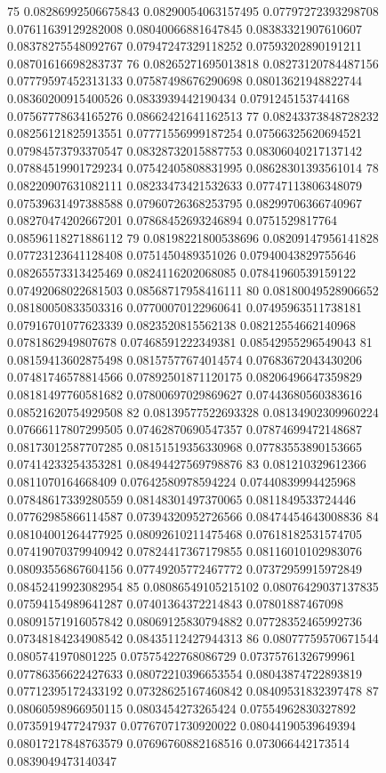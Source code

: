 75 0.08286992506675843 0.08290054063157495 0.07797272393298708 0.07611639129282008 0.08040066881647845 0.08383321907610607 0.08378275548092767 0.07947247329118252 0.07593202890191211 0.08701616698283737
76 0.08265271695013818 0.08273120784487156 0.07779597452313133 0.07587498676290698 0.08013621948822744 0.08360200915400526 0.0833939442190434 0.0791245153744168 0.07567778634165276 0.08662421641162513
77 0.08243373848728232 0.08256121825913551 0.07771556999187254 0.07566325620694521 0.07984573793370547 0.08328732015887753 0.08306040217137142 0.07884519901729234 0.07542405808831995 0.08628301393561014
78 0.08220907631082111 0.08233473421532633 0.07747113806348079 0.07539631497388588 0.07960726368253795 0.08299706366740967 0.08270474202667201 0.07868452693246894 0.0751529817764 0.08596118271886112
79 0.08198221800538696 0.08209147956141828 0.07723123641128408 0.0751450489351026 0.07940043829755646 0.08265573313425469 0.0824116202068085 0.07841960539159122 0.07492068022681503 0.08568717958416111
80 0.08180049528906652 0.08180050833503316 0.07700070122960641 0.07495963511738181 0.07916701077623339 0.0823520815562138 0.08212554662140968 0.0781862949807678 0.07468591222349381 0.08542955296549043
81 0.08159413602875498 0.08157577674014574 0.07683672043430206 0.07481746578814566 0.07892501871120175 0.08206496647359829 0.08181497760581682 0.07800697029869627 0.07443680560383616 0.08521620754929508
82 0.08139577522693328 0.08134902309960224 0.07666117807299505 0.07462870690547357 0.07874699472148687 0.08173012587707285 0.08151519356330968 0.07783553890153665 0.07414233254353281 0.08494427569798876
83 0.081210329612366 0.0811070164668409 0.07642580978594224 0.07440839994425968 0.07848617339280559 0.08148301497370065 0.0811849533724446 0.07762985866114587 0.07394320952726566 0.08474454643008836
84 0.08104001264477925 0.08092610211475468 0.07618182531574705 0.07419070379940942 0.07824417367179855 0.08116010102983076 0.08093556867604156 0.07749205772467772 0.07372959915972849 0.08452419923082954
85 0.08086549105215102 0.08076429037137835 0.07594154989641287 0.07401364372214843 0.07801887467098 0.08091571916057842 0.08069125830794882 0.07728352465992736 0.07348184234908542 0.08435112427944313
86 0.08077759570671544 0.0805741970801225 0.07575422768086729 0.07375761326799961 0.07786356622427633 0.08072210396653554 0.08043874722893819 0.07712395172433192 0.07328625167460842 0.08409531832397478
87 0.08060598966950115 0.0803454273265424 0.07554962830327892 0.0735919477247937 0.07767071730920022 0.08044190539649394 0.08017217848763579 0.07696760882168516 0.073066442173514 0.0839049473140347
